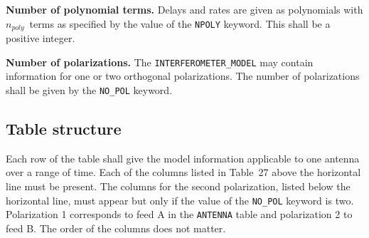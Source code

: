 \documentclass[twoside]{article}
\newcommand{\Hi}[1]{\textcolor{hicol}{#1}}
\newcommand{\npoly}{$n_{poly}$}
\begin{document}
{\bf Number of polynomial terms.}  Delays and rates are given as
polynomials with \npoly\ terms \Hi{as specified by} the value of the
{\tt NPOLY} keyword.  This shall be a positive integer.

{\bf Number of polarizations.}  The {\tt INTERFEROMETER\_MODEL} may
contain information for one or two orthogonal polarizations.  The
number of polarizations shall be given by the {\tt NO\_POL} keyword.

\subsection{Table structure}

Each row of the table shall give the model information applicable to
one antenna over a range of time.  Each of the columns listed in
Table~\Hi{27} \Hi{above the horizontal line} must be present.  The
columns for the second polarization, listed below the horizontal line,
must appear but only if the value of the {\tt NO\_POL} keyword is two.
Polarization 1 corresponds to feed A in the {\tt ANTENNA} table and
polarization 2 to feed B\@.  The order of the columns does not matter.
\end{document}
